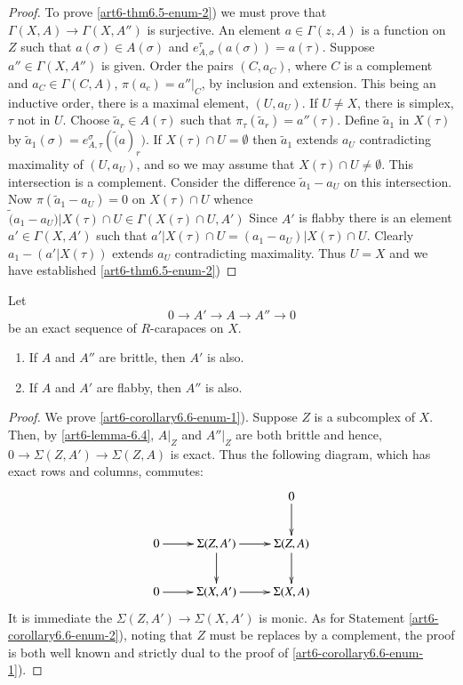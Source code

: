 \begin{proof}
To prove \ref{art6-thm6.5-enum-2}) we must prove that $\Gamma(X, A)\rightarrow \Gamma(X, A'')$ is surjective. An element $a\in \Gamma (z, A)$ is a function on $Z$ such that $a(\sigma) \in A(\sigma)$ and $e_{A, \sigma}^{\tau}(a(\sigma)) = a(\tau)$. Suppose $a'' \in \Gamma (X, A'')$ is given. Order the pairs $(C, a_{C})$, where $C$ is a complement and $a_{C} \in \Gamma(C, A)$, $\pi(a_{c}) = a''|_{C}$, by inclusion and extension. This being an inductive order, there is a  maximal element, $(U, a_{U})$. If $U \neq X$, there is simplex, $\tau$ not in $U$. Choose $\tilde{a}_{r} \in A(\tau)$ such that $\pi_{\tau}(\tilde{a}_{r}) = a''(\tau)$. Define $\tilde{a}_{1}$ in $X(\tau)$ by $\tilde{a}_{1}(\sigma) = e_{A, \tau}^{\sigma}(\tilde(a)_{r})$. If $X(\tau) \cap U = \emptyset$ then $\tilde{a}_{1}$ extends $a_{U}$ contradicting maximality of $(U,a_{U})$, and so we may assume that $X(\tau)\cap U \neq \emptyset$. This intersection is a complement. Consider the difference $\tilde{a}_{1}-a_{U}$ on this intersection. Now $\pi(\tilde{a}_{1}-a_{U})= 0$ on $X(\tau) \cap U$ whence $^{}\tilde{(}a_{1}-a_{U})|X(\tau)\cap U \in \Gamma (X(\tau)\cap U, A')$ Since $A'$ is flabby there is an element $a' \in \Gamma (X, A')$ such that $a'|X(\tau) \cap U = (a_{1}-a_{U})|X(\tau)\cap U$. Clearly $a_{1}-(a'|X(\tau))$ extends $a_{U}$ contradicting maximality. Thus $U =X$ and we have established \ref{art6-thm6.5-enum-2})
\end{proof} 

\begin{coro}\label{art6-corollary-6.6}
Let
$$
0 \rightarrow A' \rightarrow A \rightarrow A'' \rightarrow 0
$$
be an exact sequence of $R$-carapaces on $X$.
    \begin{enumerate}[(1)]
    \item If $A$ and $A''$ are brittle, then $A'$ is also.\label{art6-corollary6.6-enum-1}
    \item If $A$ and $A'$ are flabby, then $A''$ is also.\label{art6-corollary6.6-enum-2}
    \end{enumerate} 
\end{coro}

\begin{proof}
We prove \ref{art6-corollary6.6-enum-1}). Suppose $Z$ is a subcomplex of $X$. Then, by \ref{art6-lemma-6.4}, $A|_{Z}$ and $A''|_{Z}$ are both brittle and hence, $0 \rightarrow \Sigma(Z, A')\rightarrow \Sigma(Z, A)$ is exact. Thus the following diagram, which has exact rows and columns, commutes:
 $$
 \xymatrix{
 & & 0\ar[d]\\
 0 \ar[r] & \Sigma(Z, A') \ar[r]\ar[d] & \Sigma(Z, A)\ar[d]\\
 0 \ar [r] & \Sigma(X, A')\ar[r] & \Sigma(X, A)
 } 
 $$                          
It is immediate the $\Sigma(Z, A')\rightarrow \Sigma(X, A')$ is monic. As for Statement \ref{art6-corollary6.6-enum-2}), noting that $Z$ must be replaces by a complement, the proof is both well known and strictly dual to the proof of \ref{art6-corollary6.6-enum-1}).
\end{proof}

